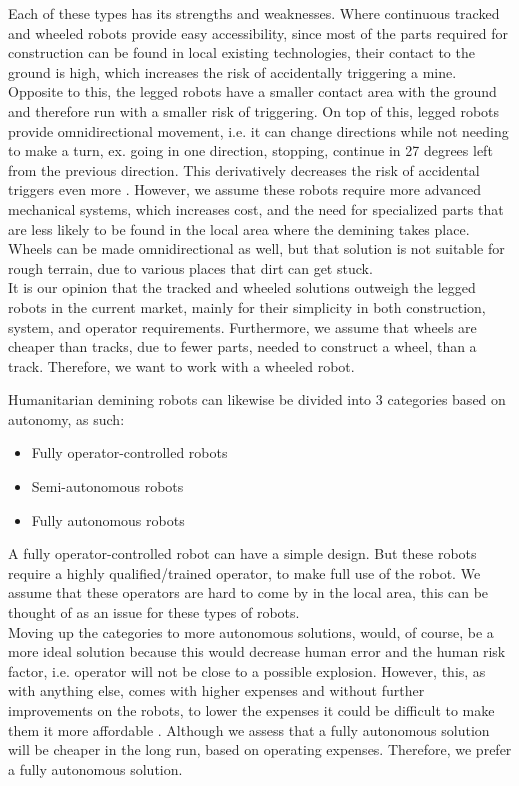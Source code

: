 Each of these types has its strengths and weaknesses. Where continuous tracked and wheeled robots provide easy accessibility, since most of the parts required for construction can be found in local existing technologies, their contact to the ground is high, which increases the risk of accidentally triggering a mine. Opposite to this, the legged robots have a smaller contact area with the ground and therefore run with a smaller risk of triggering. On top of this, legged robots provide omnidirectional movement, i.e. it can change directions while not needing to make a turn, ex. going in one direction, stopping, continue in 27 degrees left from the previous direction. This derivatively decreases the risk of accidental triggers even more \cite{6LeggedRobot2007}. However, we assume these robots require more advanced mechanical systems, which increases cost, and the need for specialized parts that are less likely to be found in the local area where the demining takes place. Wheels can be made omnidirectional as well, but that solution is not suitable for rough terrain, due to various places that dirt can get stuck.\\

It is our opinion that the tracked and wheeled solutions outweigh the legged robots in the current market, mainly for their simplicity in both construction, system, and operator requirements. Furthermore, we assume that wheels are cheaper than tracks, due to fewer parts, needed to construct a wheel, than a track. Therefore, we want to work with a wheeled robot.

\newpage

Humanitarian demining robots can likewise be divided into 3 categories based on autonomy, as such:
\begin{itemize}
\setlength{\itemsep}{0.05\baselineskip}
	\item Fully operator-controlled robots
	\item Semi-autonomous robots
	\item Fully autonomous robots
\end{itemize}

A fully operator-controlled robot can have a simple design. But these robots require a highly qualified/trained operator, to make full use of the robot. We assume that these operators are hard to come by in the local area, this can be thought of as an issue for these types of robots.\\

Moving up the categories to more autonomous solutions, would, of course, be a more ideal solution because this would decrease human error and the human risk factor, i.e. operator will not be close to a possible explosion. However, this, as with anything else, comes with higher expenses and without further improvements on the robots, to lower the expenses it could be difficult to make them it more affordable \cite{6LeggedRobot2007}. Although we assess that a fully autonomous solution will be cheaper in the long run, based on operating expenses. Therefore, we prefer a fully autonomous solution.


